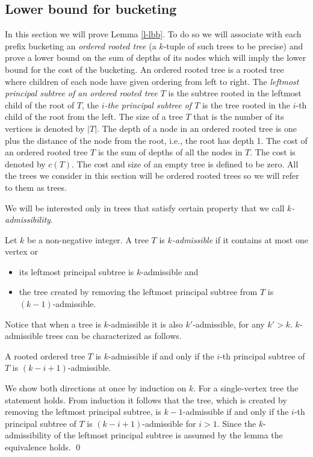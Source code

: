\documentclass[runningheads,a4paper]{llncs}
\renewenvironment{proof}{\noindent{\it Proof. }} {{\qed}}
\begin{document}
\subsection{Lower bound for bucketing}\label{s-lbb}

In this section we will prove Lemma \ref{l-lbb}. To do so we will associate with each prefix bucketing an \emph{ordered rooted tree} (a $k$-tuple of such trees to be precise) 
and prove a lower bound on the sum of depths of its nodes which will imply the lower bound for the cost of the bucketing.
An ordered rooted tree is a rooted tree where children of each node have given ordering from left to right.
The \emph{leftmost principal subtree of an ordered rooted tree $T$} is the subtree rooted in the leftmost child of the root of $T$, the \emph{$i$-the principal subtree of $T$} is the 
tree rooted in the $i$-th child of the root from the left. The size of a tree $T$ that is the number 
of its vertices is denoted by $|T|$. The depth of a node in an ordered rooted tree is one plus the distance of the node from the root, i.e., the root has depth 1. The cost
of an ordered rooted tree $T$ is the sum of depths of all the nodes in $T$. The cost is denoted by $c(T)$. The cost and size of an empty tree is defined to be zero.
All the trees we consider in this section will be ordered rooted trees so we will refer to them as trees.

We will be interested only in trees that satisfy certain property that we call \emph{$k$-admissibility}.
\begin{definition}
\label{def:k-admissibility}
Let $k$ be a non-negative integer. A tree $T$ is \emph{$k$-admissible} if it contains at most one vertex or
\begin{itemize}
\item its leftmost principal subtree is $k$-admissible and
\item the tree created by removing the leftmost principal subtree from $T$ is $(k - 1)$-admissible.
\end{itemize}
\end{definition}
Notice that when a tree is $k$-admissible it is also $k'$-admissible, for any $k'>k$. $k$-admissible trees can be characterized as follows.
\begin{lemma}
\label{lm:k-admissibility}
A rooted ordered tree $T$ is $k$-admissible if and only if the $i$-th principal subtree of $T$ is $(k - i + 1)$-admissible.
\end{lemma}
\begin{proof}
We show both directions at once by induction on $k$.
For a single-vertex tree the statement holds.
From induction it follows that the tree, which is created by removing the leftmost principal subtree, is $k - 1$-admissible if and only if the $i$-th principal subtree of $T$ is $(k - i + 1)$-admissible for $i > 1$.
Since the $k$-admissibility of the leftmost principal subtree is assumed by the lemma the equivalence holds.
\end{proof}
\end{document}
